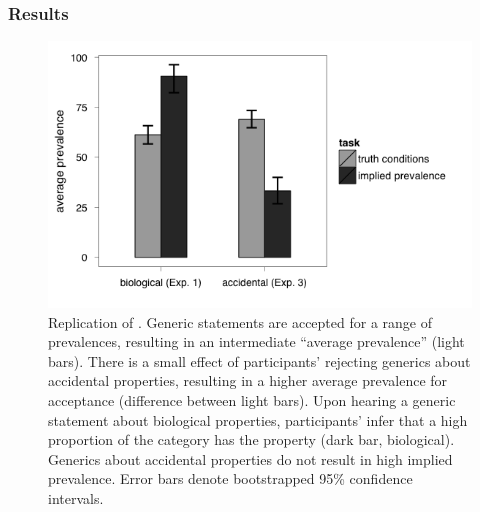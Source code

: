 \documentclass[10pt,letterpaper]{article}
\begin{document}
%

\subsubsection{Results}


\begin{figure}
\centering
    \includegraphics[width=0.8\columnwidth]{exp3_asymmetry}
    \caption{Replication of \protect{}. Generic statements are accepted for a range of prevalences, resulting in an intermediate ``average prevalence'' (light bars). There is a small effect of participants' rejecting generics about accidental properties, resulting in a higher average prevalence for acceptance (difference between light bars). Upon hearing a generic statement about biological properties, participants' infer that a high proportion of the category has the property (dark bar, biological). Generics about accidental properties do not result in high implied prevalence.  Error bars denote bootstrapped 95\% confidence intervals.}
  \label{fig:exp2a}
\end{figure}
\end{document}
